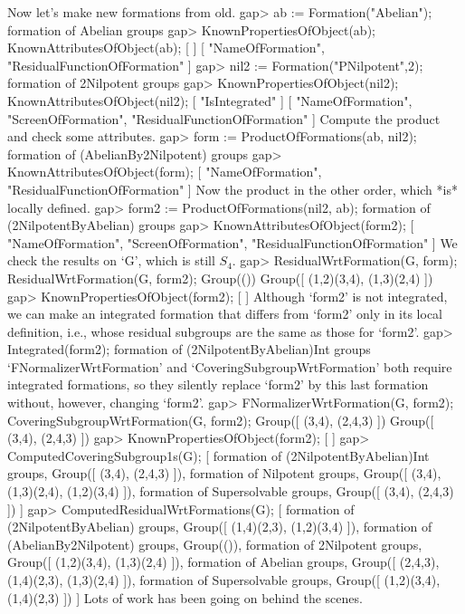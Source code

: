 Now let's make new formations from old.
\beginexample
gap> ab := Formation("Abelian");
formation of Abelian groups
gap> KnownPropertiesOfObject(ab); KnownAttributesOfObject(ab);
[  ]
[ "NameOfFormation", "ResidualFunctionOfFormation" ]
gap> nil2 := Formation("PNilpotent",2);
formation of 2Nilpotent groups
gap> KnownPropertiesOfObject(nil2); KnownAttributesOfObject(nil2);
[ "IsIntegrated" ]
[ "NameOfFormation", "ScreenOfFormation", "ResidualFunctionOfFormation" ]
\endexample
Compute the product and check some attributes.
\beginexample
gap> form := ProductOfFormations(ab, nil2);
formation of (AbelianBy2Nilpotent) groups
gap> KnownAttributesOfObject(form);
[ "NameOfFormation", "ResidualFunctionOfFormation" ]
\endexample
Now the product in the other order, which *is* locally defined.
\beginexample
gap> form2 := ProductOfFormations(nil2, ab);
formation of (2NilpotentByAbelian) groups
gap> KnownAttributesOfObject(form2);
[ "NameOfFormation", "ScreenOfFormation", "ResidualFunctionOfFormation" ]
\endexample
We check the results on `G', which is still $S_4$.
\beginexample
gap> ResidualWrtFormation(G, form);  ResidualWrtFormation(G, form2);
Group(())
Group([ (1,2)(3,4), (1,3)(2,4) ])
gap> KnownPropertiesOfObject(form2);
[  ]
\endexample
Although `form2' is not integrated, we can make an integrated formation
that differs from `form2' only in its local definition, i.e., whose
residual subgroups are the same as those for `form2'.
\beginexample
gap> Integrated(form2);
formation of (2NilpotentByAbelian)Int groups
\endexample
`FNormalizerWrtFormation' and
`CoveringSubgroupWrtFormation' both require integrated formations, so they
silently replace `form2' by this last formation without, however,
changing `form2'. 
\beginexample
gap> FNormalizerWrtFormation(G, form2); CoveringSubgroupWrtFormation(G, form2);
Group([ (3,4), (2,4,3) ])
Group([ (3,4), (2,4,3) ])
gap> KnownPropertiesOfObject(form2);
[  ]
gap> ComputedCoveringSubgroup1s(G);
[ formation of (2NilpotentByAbelian)Int groups, Group([ (3,4), (2,4,3) ]), 
  formation of Nilpotent groups, Group([ (3,4), (1,3)(2,4), (1,2)(3,4) ]), 
  formation of Supersolvable groups, Group([ (3,4), (2,4,3) ]) ]
gap> ComputedResidualWrtFormations(G);
[ formation of (2NilpotentByAbelian) groups, 
  Group([ (1,4)(2,3), (1,2)(3,4) ]), 
  formation of (AbelianBy2Nilpotent) groups, Group(()), 
  formation of 2Nilpotent groups, Group([ (1,2)(3,4), (1,3)(2,4) ]), 
  formation of Abelian groups, Group([ (2,4,3), (1,4)(2,3), (1,3)(2,4) ]), 
  formation of Supersolvable groups, Group([ (1,2)(3,4), (1,4)(2,3) ]) ]
\endexample
Lots of work has been going on behind the scenes.

